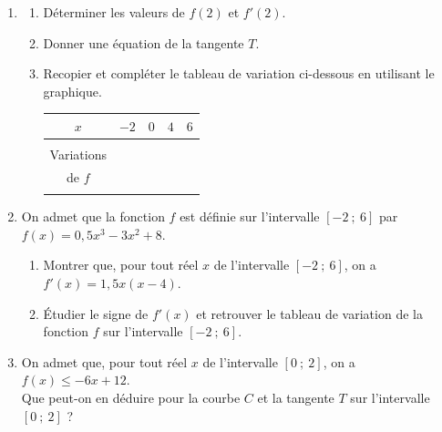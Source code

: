 \documentclass[10pt]{article}
\begin{document}
\begin{enumerate}
\item 
\begin{enumerate}
\item Déterminer les valeurs de $f(2)$ et $f'(2)$.
\item Donner une équation de la tangente $T$.
\item Recopier et compléter le tableau de variation ci-dessous en utilisant le graphique.

\begin{center}
\setlength{\tabcolsep}{18pt}
\begin{tabular}{|c|cccc|}
\hline
$x$ & $-2$ & $0$ & $4$ & $6$ \\
\hline
 & & & & \\
Variations & & & & \\
de $f$ & & & & \\
 & & & & \\
\hline
\end{tabular}
\end{center}
\end{enumerate}

\item On admet que la fonction $f$ est définie sur l'intervalle $[-2~;~6]$ par $f(x) = 0,5x^3 - 3x^2 + 8$.
\begin{enumerate}
\item Montrer que, pour tout réel $x$ de l'intervalle $[-2~;~6]$, on a $f'(x) = 1,5x(x - 4)$.
\item Étudier le signe de $f'(x)$ et retrouver le tableau de variation de la fonction $f$ sur l'intervalle $[-2~;~6]$.
\end{enumerate}

\item On admet que, pour tout réel $x$ de l'intervalle $[0~;~2]$, on a $f(x) \leq -6x + 12$. \\
Que peut-on en déduire pour la courbe $C$ et la tangente $T$ sur l'intervalle $[0~;~2]$ ?
\end{enumerate}
\end{document}
